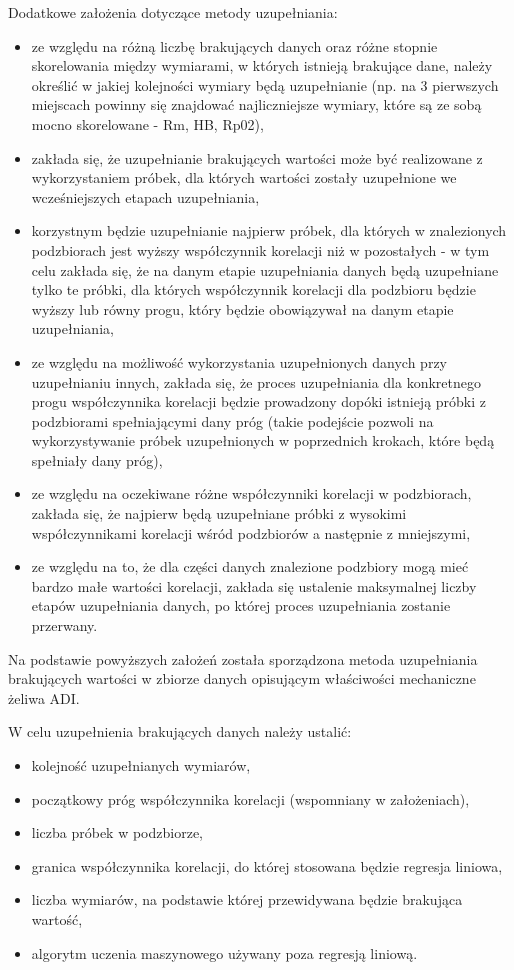 Dodatkowe założenia dotyczące metody uzupełniania:
\begin{itemize}
    \item ze względu na różną liczbę brakujących danych oraz różne stopnie skorelowania między wymiarami, w których istnieją brakujące dane, należy określić w jakiej kolejności wymiary będą uzupełnianie (np. na 3 pierwszych miejscach powinny się znajdować najliczniejsze wymiary, które są ze sobą mocno skorelowane - Rm, HB, Rp02),
    \item zakłada się, że uzupełnianie brakujących wartości może być realizowane z wykorzystaniem próbek, dla których wartości zostały uzupełnione we wcześniejszych etapach uzupełniania,
    \item korzystnym będzie uzupełnianie najpierw próbek, dla których w znalezionych podzbiorach jest wyższy współczynnik korelacji niż w pozostałych - w tym celu zakłada się, że na danym etapie uzupełniania danych będą uzupełniane tylko te próbki, dla których współczynnik korelacji dla podzbioru będzie wyższy lub równy progu, który będzie obowiązywał na danym etapie uzupełniania,
    \item ze względu na możliwość wykorzystania uzupełnionych danych przy uzupełnianiu innych, zakłada się, że proces uzupełniania dla konkretnego progu współczynnika korelacji będzie prowadzony dopóki istnieją próbki z podzbiorami spełniającymi dany próg (takie podejście pozwoli na wykorzystywanie próbek uzupełnionych w poprzednich krokach, które będą spełniały dany próg),
    \item ze względu na oczekiwane różne współczynniki korelacji w podzbiorach, zakłada się, że najpierw będą uzupełniane próbki z wysokimi współczynnikami korelacji wśród podzbiorów a następnie z mniejszymi,
    \item ze względu na to, że dla części danych znalezione podzbiory mogą mieć bardzo małe wartości korelacji, zakłada się ustalenie maksymalnej liczby etapów uzupełniania danych, po której proces uzupełniania zostanie przerwany.
\end{itemize}

Na podstawie powyższych założeń została sporządzona metoda uzupełniania brakujących wartości w zbiorze danych opisującym właściwości mechaniczne żeliwa ADI. 

W celu uzupełnienia brakujących danych należy ustalić:
\begin{itemize}
    \item kolejność uzupełnianych wymiarów,
    \item początkowy próg współczynnika korelacji (wspomniany w założeniach),
    \item liczba próbek w podzbiorze,
    \item granica współczynnika korelacji, do której stosowana będzie regresja liniowa,
    \item liczba wymiarów, na podstawie której przewidywana będzie brakująca wartość,
    \item algorytm uczenia maszynowego używany poza regresją liniową.
\end{itemize}

